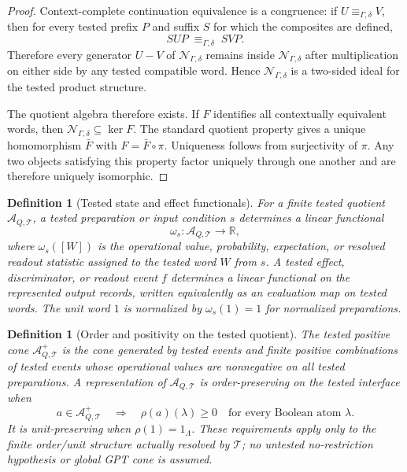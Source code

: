 \documentclass[11pt]{article}
\newtheorem{definition}[theorem]{Definition}
\newcommand{\AQtest}{\mathcal A_{Q,\mathcal T}}
\begin{document}
\begin{proof}
Context-complete continuation equivalence is a congruence: if
$U\equiv_{\Gamma,\delta}V$, then for every tested prefix $P$ and suffix
$S$ for which the composites are defined,
\[
    SUP \;\equiv_{\Gamma,\delta}\; SVP.
\]
Therefore every generator $U-V$ of $\mathcal N_{\Gamma,\delta}$ remains
inside $\mathcal N_{\Gamma,\delta}$ after multiplication on either side
by any tested compatible word.  Hence $\mathcal N_{\Gamma,\delta}$ is a
two-sided ideal for the tested product structure.

The quotient algebra therefore exists.  If $F$ identifies all
contextually equivalent words, then
$\mathcal N_{\Gamma,\delta}\subseteq\ker F$.  The standard quotient
property gives a unique homomorphism $\bar F$ with
$F=\bar F\circ\pi$.  Uniqueness follows from surjectivity of $\pi$.
Any two objects satisfying this property factor uniquely through one
another and are therefore uniquely isomorphic.
\end{proof}


\begin{definition}[Tested state and effect functionals]\label{def:tested-state-effect-functionals}
For a finite tested quotient $\AQtest$, a tested preparation or input condition $s$ determines a linear functional
\[
  \omega_s:\AQtest\to\mathbb R,
\]
where $\omega_s([W])$ is the operational value, probability, expectation, or resolved readout statistic assigned to the tested word $W$ from $s$.  A tested effect, discriminator, or readout event $f$ determines a linear functional on the represented output records, written equivalently as an evaluation map on tested words.  The unit word $1$ is normalized by $\omega_s(1)=1$ for normalized preparations.
\end{definition}

\begin{definition}[Order and positivity on the tested quotient]\label{def:tested-order-positivity}
The tested positive cone $\AQtest^+$ is the cone generated by tested events and finite positive combinations of tested events whose operational values are nonnegative on all tested preparations.  A representation of $\AQtest$ is order-preserving on the tested interface when
\[
  a\in\AQtest^+ \quad\Longrightarrow\quad \rho(a)(\lambda)\geq 0
  \quad\text{for every Boolean atom }\lambda.
\]
It is unit-preserving when $\rho(1)=1_\Lambda$.  These requirements apply only to the finite order/unit structure actually resolved by $\mathcal T$; no untested no-restriction hypothesis or global GPT cone is assumed.
\end{definition}
\end{document}
